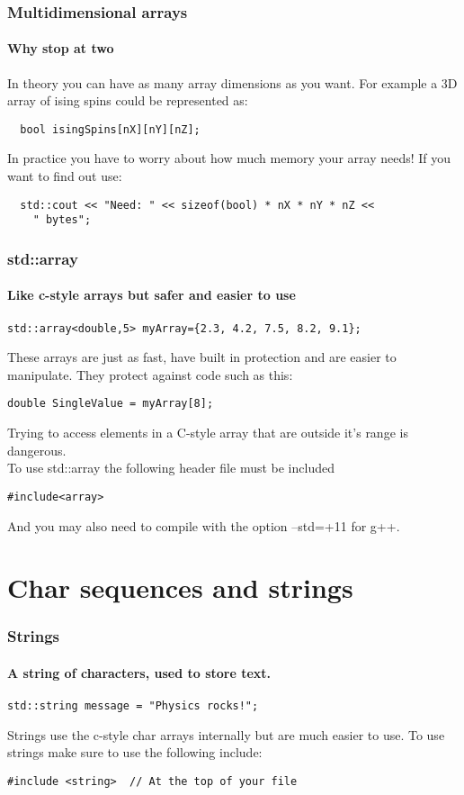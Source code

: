 \documentclass{beamer}
\begin{document}
\begin{frame}[fragile]
  \frametitle{Multidimensional arrays}
  \framesubtitle{Why stop at two}
  In theory you can have as many array dimensions as you want.  For example a 3D array of ising spins could be represented as:
  \begin{lstlisting}
  bool isingSpins[nX][nY][nZ];
  \end{lstlisting}
  In practice you have to worry about how much memory your array needs!\pause{}  If you want to find out use:
  \begin{lstlisting}
  std::cout << "Need: " << sizeof(bool) * nX * nY * nZ <<
    " bytes";
  \end{lstlisting}

\end{frame}

\begin{frame}[fragile]
	\frametitle{std::array}
	\framesubtitle{Like c-style arrays but safer and easier to use}
	\begin{lstlisting}
std::array<double,5> myArray={2.3, 4.2, 7.5, 8.2, 9.1};
	\end{lstlisting}
	These arrays are just as fast, have built in protection and are easier to manipulate. \pause They protect against code such as this:
	\begin{lstlisting}
double SingleValue = myArray[8];
	\end{lstlisting}
	Trying to access elements in a C-style array that are outside it's range is dangerous.\\
	\pause To use std::array the following header file must be included
	\begin{lstlisting}
#include<array>
	\end{lstlisting}
	And you may also need to compile with the option --std=+11 for g++.
\end{frame}

\section{Char sequences and strings}


\begin{frame}[fragile]
  \frametitle{Strings}
  \framesubtitle{A string of characters, used to store text.}
  
  \begin{lstlisting}
std::string message = "Physics rocks!";
  \end{lstlisting}
  Strings use the c-style char arrays internally but are much easier to use.
  To use strings make sure to use the following include:
  \begin{lstlisting}
#include <string>  // At the top of your file
  \end{lstlisting}
\end{frame}
\end{document}
